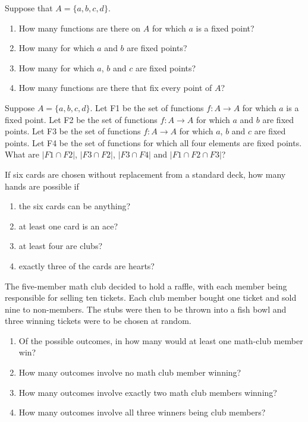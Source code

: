 \begin{prb}
Suppose that $A = \{a, b, c, d\}$.
\begin{enumerate}
\item How many functions are there on $A$ for which $a$ is a fixed point?
\item How many for which $a$ and $b$ are fixed points?
\item How many for which  $a$, $b$ and $c$ are fixed points?
\item How many functions are there that fix every point of $A$?
\end{enumerate}
\end{prb}

\begin{prb}
Suppose  $A = \{a, b, c, d \}$. Let F1 be the set of functions $f:A \to A$ for which $a$ is a fixed point. Let F2 be the set of functions $f:A \to A$ for which $a$ and $b$ are fixed points. Let F3 be the set of functions $f:A \to A$ for which $a$, $b$ and $c$ are fixed points. Let F4 be the set of functions for which all four elements are fixed points. What are $|F1 \cap F2|$, $|F3 \cap F2|$, $|F3 \cap F4|$ and $|F1 \cap F2 \cap F3|$?
\end{prb}

\begin{prb}
If six cards are chosen without replacement from a standard deck, how many hands are possible if
\begin{enumerate}
\item  the six cards can be anything?
\item  at least one card is an ace?
\item  at least four are clubs?
\item  exactly three of the cards are hearts?
\end{enumerate}
\end{prb}

\begin{prb}
The five-member math club decided to hold a raffle, with each member being responsible for selling ten tickets. Each club member bought one ticket and sold nine to non-members.  The stubs were then to be thrown into a fish bowl and three winning tickets were to be chosen at random.
\begin{enumerate}
\item  Of the  possible outcomes, in how many would at least one math-club member win?
\item  How many outcomes involve no math club member winning?
\item  How many outcomes involve exactly two math club members winning?
\item  How many outcomes involve all three winners being club members?
\end{enumerate}
\end{prb}

